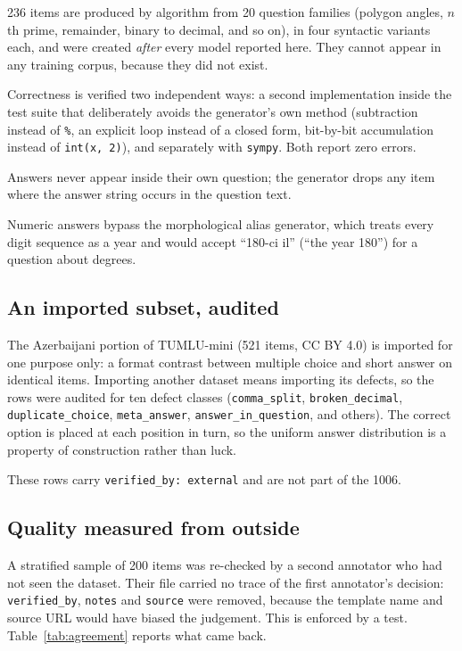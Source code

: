 \documentclass[final]{clv2025}
\begin{document}
236 items are produced by algorithm from 20 question families (polygon angles,
$n$th prime, remainder, binary to decimal, and so on), in four syntactic
variants each, and were created \emph{after} every model reported here. They
cannot appear in any training corpus, because they did not exist.

Correctness is verified two independent ways: a second implementation inside
the test suite that deliberately avoids the generator's own method (subtraction
instead of \texttt{\%}, an explicit loop instead of a closed form, bit-by-bit
accumulation instead of \texttt{int(x, 2)}), and separately with \texttt{sympy}.
Both report zero errors.

Answers never appear inside their own question; the generator drops any item
where the answer string occurs in the question text.

Numeric answers bypass the morphological alias generator, which treats every
digit sequence as a year and would accept ``180-ci il'' (``the year 180'') for
a question about degrees.

\subsection{An imported subset, audited}

The Azerbaijani portion of TUMLU-mini (521 items, CC BY 4.0) is imported for
one purpose only: a format contrast between multiple choice and short answer on
identical items. Importing another dataset means importing its defects, so the
rows were audited for ten defect classes (\texttt{comma\_split},
\texttt{broken\_decimal}, \texttt{duplicate\_choice}, \texttt{meta\_answer},
\texttt{answer\_in\_question}, and others). The correct option is placed at
each position in turn, so the uniform answer distribution is a property of
construction rather than luck.

These rows carry \texttt{verified\_by: external} and are not part of the 1006.

\subsection{Quality measured from outside}

A stratified sample of 200 items was re-checked by a second annotator who had
not seen the dataset. Their file carried no trace of the first annotator's
decision: \texttt{verified\_by}, \texttt{notes} and \texttt{source} were
removed, because the template name and source URL would have biased the
judgement. This is enforced by a test. Table~\ref{tab:agreement} reports
what came back.
\end{document}
